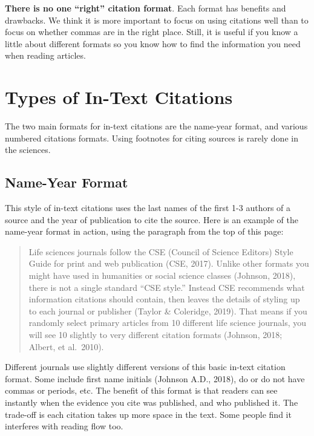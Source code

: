 \documentclass[
]{book}
\begin{document}
\textbf{There is no one ``right'' citation format}. Each format has benefits and drawbacks. We think it is more important to focus on using citations well than to focus on whether commas are in the right place. Still, it is useful if you know a little about different formats so you know how to find the information you need when reading articles.

\hypertarget{types-of-in-text-citations}{%
\section{Types of In-Text Citations}\label{types-of-in-text-citations}}

The two main formats for in-text citations are the name-year format, and various numbered citations formats. Using footnotes for citing sources is rarely done in the sciences.

\hypertarget{name-year-format}{%
\subsection{Name-Year Format}\label{name-year-format}}

This style of in-text citations uses the last names of the first 1-3 authors of a source and the year of publication to cite the source. Here is an example of the name-year format in action, using the paragraph from the top of this page:

\begin{quote}
Life sciences journals follow the CSE (Council of Science Editors) Style Guide for print and web publication (CSE, 2017). Unlike other formats you might have used in humanities or social science classes (Johnson, 2018), there is not a single standard ``CSE style.'' Instead CSE recommends what information citations should contain, then leaves the details of styling up to each journal or publisher (Taylor \& Coleridge, 2019). That means if you randomly select primary articles from 10 different life science journals, you will see 10 slightly to very different citation formats (Johnson, 2018; Albert, et al.~2010).
\end{quote}

Different journals use slightly different versions of this basic in-text citation format. Some include first name initials (Johnson A.D., 2018), do or do not have commas or periods, etc. The benefit of this format is that readers can see instantly when the evidence you cite was published, and who published it. The trade-off is each citation takes up more space in the text. Some people find it interferes with reading flow too.
\end{document}
